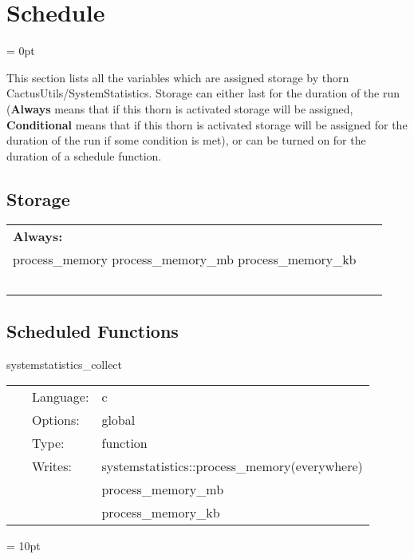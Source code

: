 
\section{Schedule} 


\parskip = 0pt


\noindent This section lists all the variables which are assigned storage by thorn CactusUtils/SystemStatistics.  Storage can either last for the duration of the run ({\bf Always} means that if this thorn is activated storage will be assigned, {\bf Conditional} means that if this thorn is activated storage will be assigned for the duration of the run if some condition is met), or can be turned on for the duration of a schedule function.


\subsection*{Storage}

\hspace{5mm}

 \begin{tabular*}{160mm}{ll} 

{\bf Always:}&  ~ \\ 
 process\_memory process\_memory\_mb process\_memory\_kb & ~\\ 
~ & ~\\ 
\end{tabular*} 


\subsection*{Scheduled Functions}
\vspace{5mm}


\hspace{5mm} systemstatistics\_collect 

\hspace{5mm}{\it collect system statistics } 


\hspace{5mm}

 \begin{tabular*}{160mm}{cll} 
~ & Language:  & c \\ 
~ & Options:  & global \\ 
~ & Type:  & function \\ 
~ & Writes:  & systemstatistics::process\_memory(everywhere) \\ 
~& ~ &process\_memory\_mb\\ 
~& ~ &process\_memory\_kb\\ 
\end{tabular*} 



\vspace{5mm}\parskip = 10pt 
